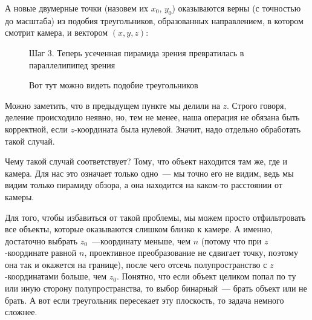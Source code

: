 \documentclass{article}
\begin{document}
А новые двумерные точки (назовем их $x_0$, $y_0$) оказываются верны (с точностью до масштаба) из подобия треугольников, образованных направлением, в котором смотрит камера, и вектором $(x, y, z)$:


\begin{center}
\begin{figure}[H]
\caption{Шаг 3. Теперь усеченная пирамида зрения превратилась в параллелипипед зрения}
\label{ris:image}
\end{figure}
\end{center}

\begin{center}
\begin{figure}[H]
\caption{Вот тут можно видеть подобие треугольников}
\label{ris:image}
\end{figure}
\end{center}


Можно заметить, что в предыдущем пункте мы делили на $z$. Строго говоря, деление происходило неявно, но, тем не менее, наша операция не обязана быть корректной, если $z$-координата была нулевой. Значит, надо отдельно обработать такой случай.

Чему такой случай соответствует? Тому, что объект находится там же, где и камера. Для нас это означает только одно~--- мы точно его не видим, ведь мы видим только пирамиду обзора, а она находится на каком-то расстоянии от камеры.

Для того, чтобы избавиться от такой проблемы, мы можем просто отфильтровать все объекты, которые оказываются слишком близко к камере. А именно, достаточно выбрать $z_0$~---координату меньше, чем $n$ (потому что при $z$-координате равной $n$, проективное преобразование не сдвигает точку, поэтому она так и окажется на границе), после чего отсечь полупространство с $z$-координатами больше, чем $z_0$. Понятно, что если объект целиком попал по ту или иную сторону полупространства, то выбор бинарный~--- брать объект или не брать. А вот если треугольник пересекает эту плоскость, то задача немного сложнее.
\end{document}
